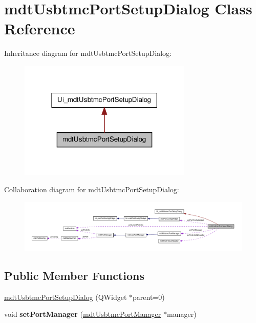 \hypertarget{classmdt_usbtmc_port_setup_dialog}{
\section{mdtUsbtmcPortSetupDialog Class Reference}
\label{classmdt_usbtmc_port_setup_dialog}
}


Inheritance diagram for mdtUsbtmcPortSetupDialog:\nopagebreak
\begin{figure}[H]
\begin{center}
\leavevmode
\includegraphics[width=234pt]{classmdt_usbtmc_port_setup_dialog__inherit__graph}
\end{center}
\end{figure}


Collaboration diagram for mdtUsbtmcPortSetupDialog:
\nopagebreak
\begin{figure}[H]
\begin{center}
\leavevmode
\includegraphics[width=400pt]{classmdt_usbtmc_port_setup_dialog__coll__graph}
\end{center}
\end{figure}
\subsection*{Public Member Functions}
\begin{DoxyCompactItemize}
\item 
\hyperlink{classmdt_usbtmc_port_setup_dialog_afdfb9303c8c2a1c9da8ecb19d5c19610}{mdtUsbtmcPortSetupDialog} (QWidget $\ast$parent=0)
\item 
\hypertarget{classmdt_usbtmc_port_setup_dialog_a6ba6d427e46bfcdd32c5ac740040de4e}{
void {\bfseries setPortManager} (\hyperlink{classmdt_usbtmc_port_manager}{mdtUsbtmcPortManager} $\ast$manager)}
\label{classmdt_usbtmc_port_setup_dialog_a6ba6d427e46bfcdd32c5ac740040de4e}

\end{DoxyCompactItemize}


